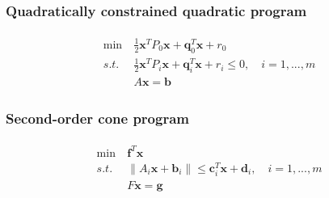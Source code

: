 \subsubsection{Quadratically constrained quadratic program}
\begin{align}
    \begin{array}{lll}
        \min \ &\frac{1}{2} \mathbf{x}^T P_0 \mathbf{x}
        + \mathbf{q}_0^T \mathbf{x} + r_0 \\
        s.t. \ &\frac{1}{2} \mathbf{x}^T P_i \mathbf{x}
        + \mathbf{q}_i^T \mathbf{x} + r_i \leq 0, \quad i = 1,...,m \\
        & A \mathbf{x} = \mathbf{b}
    \end{array}
\end{align}


\par
\subsubsection{Second-order cone program}
\begin{align}
    \begin{array}{lll}
        \min \ & \mathbf{f}^T \mathbf{x} \\
        s.t. \ & \parallel A_i \mathbf{x} + \mathbf{b}_i \parallel
        \leq \mathbf{c}_i^T\mathbf{x} + \mathbf{d}_i, \quad i = 1,...,m \\
        & F\mathbf{x} = \mathbf{g}
    \end{array}
\end{align}

